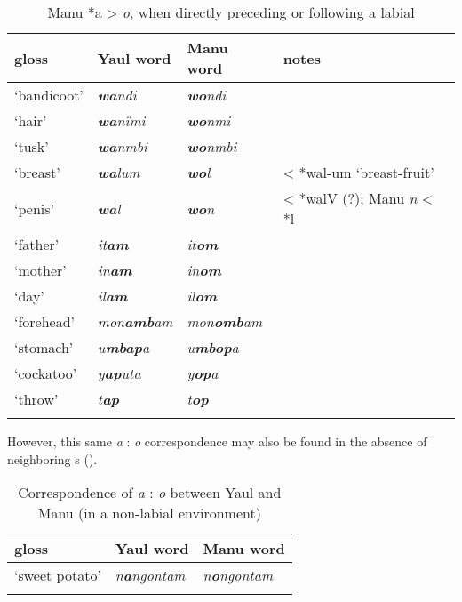 \begin{table}
\caption{Manu *a > \textit{o}, when directly preceding or following a labial}
\label{tab:18.17}


\begin{tabular}{llll}

\lsptoprule

gloss & Yaul word & Manu word & notes\\
\midrule
‘bandicoot’ & {\itshape \textbf{wa}ndi} & {\itshape \textbf{wo}ndi} & \\
‘hair’ & {\itshape \textbf{wa}nïmi} & {\itshape \textbf{wo}nmi} & \\
‘tusk’ & {\itshape \textbf{wa}nmbi} & {\itshape \textbf{wo}nmbi} & \\
‘breast’ & {\itshape \textbf{wa}lum} & {\itshape \textbf{wo}l} & < *wal-um ‘breast-fruit’\\
‘penis’ & {\itshape \textbf{wa}l} & {\itshape \textbf{wo}n} & < *walV (?); Manu \textit{n} < *l\\
‘father’ & {\itshape it\textbf{am}} & {\itshape it\textbf{om}} & \\
‘mother’ & {\itshape in\textbf{am}} & {\itshape in\textbf{om}} & \\
‘day’ & {\itshape il\textbf{am}} & {\itshape il\textbf{om}} & \\
‘forehead’ & {\itshape mon\textbf{amb}am} & {\itshape mon\textbf{omb}am} & \\
‘stomach’ & {\itshape u\textbf{mbap}a} & {\itshape u\textbf{mbop}a} & \\
‘cockatoo’ & {\itshape y\textbf{ap}uta} & {\itshape y\textbf{op}a} & \\
‘throw’ & {\itshape t\textbf{ap}} & {\itshape t\textbf{op}} & \\
\lspbottomrule
\end{tabular}
\end{table}
However, this same \textit{a} : \textit{o} correspondence may also be found in the absence of neighboring s ().


\begin{table}
\caption{Correspondence of \textit{a} : \textit{o} between Yaul and Manu (in a non-labial environment)}
\label{tab:18.18}


\begin{tabular}{lll}

\lsptoprule

gloss & Yaul word & Manu word\\
\midrule
‘sweet potato’ & {\itshape n\textbf{a}ngontam} & {\itshape n\textbf{o}ngontam}\\
\lspbottomrule
\end{tabular}
\end{table}

